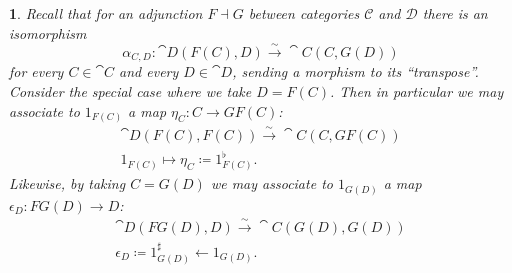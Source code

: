 \documentclass[12pt]{article}
\newtheorem{para}[theorem]{}
\begin{document}
\begin{para}
	Recall that for an adjunction $F\dashv G$ between categories $\mathcal{C}$ and $\mathcal{D}$ there is an isomorphism 
	\begin{equation*}
		\alpha_{C,D}:\cat{D}(F(C), D) \overset{\sim}{\to}\cat{C}(C, G(D))
	\end{equation*}
	for every $C\in\cat{C}$ and every $D\in\cat{D}$, sending a morphism to its ``transpose''. Consider the special case where we take $D=F(C)$. Then in particular we may associate to $1_{F(C)}$ a map $\eta_C: C\to GF(C)$:
	\begin{gather*}
		\cat{D}(F(C), F(C)) \overset{\sim}{\to} \cat{C}(C, GF(C)) \\
		1_{F(C)} \mapsto \eta_C \coloneqq 1_{F(C)}^\flat.
	\end{gather*}
	Likewise, by taking $C=G(D)$ we may associate to $1_{G(D)}$ a map $\epsilon_D: FG(D)\to D$:
	\begin{gather*}
		\cat{D}(FG(D), D) \overset{\sim}{\to} \cat{C}(G(D), G(D)) \\
		\epsilon_D\coloneqq 1_{G(D)}^\sharp \leftarrow 1_{G(D)}.
	\end{gather*}
\end{para}
\end{document}
